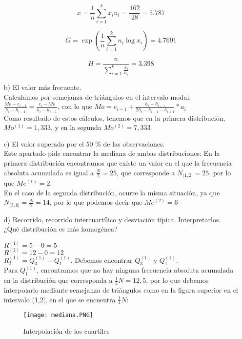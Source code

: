 \documentclass[a4paper,12pt]{article}
\begin{document}
\begin{itemize}
    $$\bar x = \frac {1}{n} \sum\limits_{i = 1}^k {x_i n_i} = \frac{162}{28} = 5.787 $$

    $$G = \exp\left(\frac{1}{n} \sum\limits_{i = 1}^k n_i \log x_i\right) = 4.7691$$

    $$H = \frac{n}{\sum\limits_{i = 1}^k \frac{x_i}{n_i}} = 3.398$$
    
    \item[b)] El valor más frecuente.\\
    Calculamos por semejanza de triángulos en el intervalo modal: $\frac{Mo-e_{i-1}}{h_i-h_{i-1}}=\frac{e_i-Mo}{h_i-h_{i+1}}$, con lo que $Mo=e_{i-1}+\frac{h_i-h_{i-1}}{2h_i-h_{i-1}-h_{i+1}}*a_i$\\
    Como resultado de estos cálculos, tenemos que en la primera distribución, $Mo^{(1)}=1,333$, y en la segunda $Mo^{(2)}=7,333$\\
    
    \item[c)] El valor superado por el 50 \% de las observaciones.\\
    Este apartado pide encontrar la mediana de ambas distribuciones:
    En la primera distribución encontramos que existe un valor en el que la frecuencia absoluta acumulada es igual a $\frac{N}{2}=25$, que corresponde a $N_{(1,2]}=25$, por lo que $Me^{(1)}= 2$.\\
    En el caso de la segunda distribución, ocurre la misma situación, ya que $N_{(3,6]}=\frac{N}{2}=14$, por lo que podemos decir que $Me^{(2)}=6$
    
    
    \item[d)] Recorrido, recorrido intercuartílico y desviación típica. Interpretarlos. ¿Qué distribución es más homogénea?

    $R^{(1)}=5-0=5$\\
    $R^{(2)}=12-0=12$\\

    $R_{I}^{(1)}=Q_3^{(1)}-Q_1^{(1)}$. Debemos encontrar $Q_3^{(1)}$ y $Q_1^{(1)}$.\\
    Para $Q_1^{(1)}$, encontramos que no hay ninguna frecuencia absoluta acumulada en la distribución que corresponda a $\frac{1}{4}N=12,5$, por lo que debemos interpolarlo mediante semejanza de triángulos como en la figura superior en el intervalo (1,2], en el que se encuentra $\frac{1}{4}N$:
    
\begin{figure}
        \centering
        \texttt{[image: mediana.PNG]}
        \caption{Interpolación de los cuartiles}
        \label{fig:enter-label}
    \end{figure}


\end{itemize}
\end{document}
